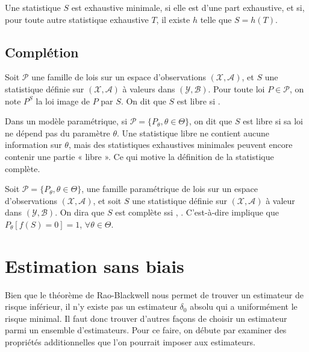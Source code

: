 \documentclass[10pt, french]{report}
\begin{document}
\begin{multicols*}{2}
\bigskip

\begin{definitionNOHFILL}
Une statistique $S$ est exhaustive minimale, si elle est d'une part exhaustive, et si, pour toute autre statistique exhaustive $T$, il existe $h$ telle que $S = h(T)$.
\end{definitionNOHFILL}


\columnbreak
\section{Complétion}
\begin{definitionNOHFILL}
Soit $\mathcal{P}$ une famille de lois sur un espace d'observations $(\mathcal{X}, \mathcal{A})$, et $S$ une statistique définie sur $(\mathcal{X}, \mathcal{A})$ à valeurs dans $(\mathcal{Y}, \mathcal{B})$. Pour toute loi $P \in \mathcal{P}$, on note $P^{S}$ la loi image de $P$ par $S$. On dit que $S$ est libre si  .

\bigskip

Dans un modèle paramétrique, si $\mathcal{P} = \{P_{\theta}, \theta \in \Theta\}$, on dit que $S$ est libre si sa loi ne dépend pas du paramètre $\theta$. Une statistique libre ne contient aucune information sur $\theta$, mais des statistiques exhaustives minimales peuvent encore contenir une partie « libre ». Ce qui motive la définition de la statistique complète.
\end{definitionNOHFILL}

\begin{definitionNOHFILL}
Soit $\mathcal{P} = \{P_{\theta}, \theta \in \Theta\}$, une famille paramétrique de lois sur un espace d'observations $(\mathcal{X}, \mathcal{A})$, et soit $S$ une statistique définie sur $(\mathcal{X}, \mathcal{A})$ à valeur dans $(\mathcal{Y}, \mathcal{B})$. On dira que $S$ est complète ssi \lfbox[conditions]{$\forall \theta \in \Theta$}, . C'est-à-dire implique que $P_{\theta}[f(S) = 0] = 1$, $\forall \theta \in \Theta$.
\end{definitionNOHFILL}



\newpage
\chapter{Estimation sans biais}
\begin{rappel_enhanced}[Contexte]
Bien que le théorème de Rao-Blackwell nous permet de trouver un estimateur de risque inférieur, il n'y existe pas un estimateur $\delta_{0}$ absolu qui a uniformément le risque minimal. Il faut donc trouver d'autres façons de choisir un estimateur parmi un ensemble d'estimateurs. Pour ce faire, on débute par examiner des propriétés additionnelles que l'on pourrait imposer aux estimateurs.
\end{rappel_enhanced}


\end{multicols*}
\end{document}
